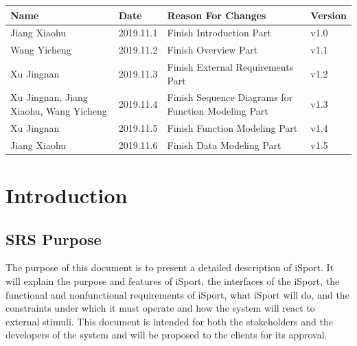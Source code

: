 \documentclass[16pt]{scrreprt}
\begin{document}
\begin{center}
    \begin{tabular}{|p{5cm}|p{3cm}|p{7cm}|p{2cm}|}
        \hline
	    Name & Date & Reason For Changes & Version\\
        \hline
	    Jiang Xiaohu & 2019.11.1 & Finish Introduction Part  & v1.0\\
        \hline
	    Wang Yicheng & 2019.11.2 & Finish Overview Part & v1.1\\
        \hline
        Xu Jingnan & 2019.11.3 & Finish External Requirements Part & v1.2\\
        \hline
        Xu Jingnan, Jiang Xiaohu, Wang Yicheng & 2019.11.4 & Finish Sequence Diagrams for Function Modeling Part& v1.3\\
        \hline
        Xu Jingnan & 2019.11.5 & Finish Function Modeling Part & v1.4\\
        \hline
        Jiang Xiaohu & 2019.11.6 & Finish Data Modeling Part  & v1.5\\
        \hline
    \end{tabular}
\end{center}

\chapter{Introduction}

\section{SRS Purpose}
The purpose of this document is to present a detailed description of iSport. It will explain the purpose and features of iSport, the interfaces of the iSport, the functional and nonfunctional requirements of iSport, what iSport will do, and the constraints under which it must operate and how the system will react to external stimuli. This document is intended for both the stakeholders and the developers of the system and will be proposed to the clients for its approval.
\end{document}
